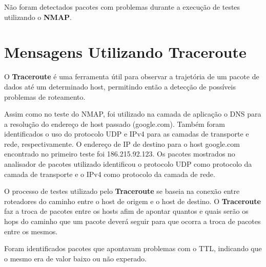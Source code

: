   Não foram detectados pacotes com problemas durante a execução de testes utilizando o \textbf{NMAP}.


\section{Mensagens Utilizando Traceroute}

O \textbf{Traceroute} é uma ferramenta útil para observar a trajetória de um pacote de dados até um determinado host, permitindo então a detecção de possíveis problemas de roteamento.

Assim como no teste do NMAP, foi utilizado na camada de aplicação o DNS para a resolução do endereço de host passado (google.com). Também foram identificados o uso do protocolo UDP e IPv4 para as camadas de transporte e rede, respectivamente.
O endereço de IP de destino para o host google.com encontrado no primeiro teste foi 186.215.92.123. Os pacotes mostrados no analisador de pacotes utilizado identificou o protocolo UDP como protocolo da camada de transporte e o IPv4 como protocolo da camada de rede.

O processo de testes utilizado pelo \textbf{Traceroute} se baseia na conexão entre roteadores do caminho entre o host de origem e o host de destino. O \textbf{Traceroute} faz a troca de pacotes entre os hosts afim de apontar quantos e quais serão os hops do caminho que um pacote deverá seguir para que ocorra a troca de pacotes entre os mesmos.

Foram identificados pacotes que apontavam problemas com o TTL, indicando que o mesmo era de valor baixo ou não experado.
